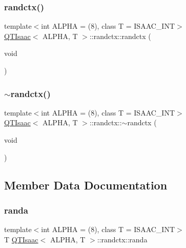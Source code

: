 \subsubsection{\texorpdfstring{randctx()}{randctx()}}
{\footnotesize\ttfamily template$<$int A\+L\+P\+HA = (8), class T = I\+S\+A\+A\+C\+\_\+\+I\+NT$>$ \\
\hyperlink{classQTIsaac}{Q\+T\+Isaac}$<$ A\+L\+P\+HA, T $>$\+::randctx\+::randctx (\begin{DoxyParamCaption}\item[{void}]{ }\end{DoxyParamCaption})\hspace{0.3cm}{\ttfamily [inline]}}

\mbox{\label{structQTIsaac_1_1randctx_a10c2275a173a11614314467047fdf501}} 
\subsubsection{\texorpdfstring{$\sim$randctx()}{~randctx()}}
{\footnotesize\ttfamily template$<$int A\+L\+P\+HA = (8), class T = I\+S\+A\+A\+C\+\_\+\+I\+NT$>$ \\
\hyperlink{classQTIsaac}{Q\+T\+Isaac}$<$ A\+L\+P\+HA, T $>$\+::randctx\+::$\sim$randctx (\begin{DoxyParamCaption}\item[{void}]{ }\end{DoxyParamCaption})\hspace{0.3cm}{\ttfamily [inline]}}



\subsection{Member Data Documentation}
\mbox{\label{structQTIsaac_1_1randctx_abdf0625b9f67bf4b7975b2c71034c796}} 
\subsubsection{\texorpdfstring{randa}{randa}}
{\footnotesize\ttfamily template$<$int A\+L\+P\+HA = (8), class T = I\+S\+A\+A\+C\+\_\+\+I\+NT$>$ \\
T \hyperlink{classQTIsaac}{Q\+T\+Isaac}$<$ A\+L\+P\+HA, T $>$\+::randctx\+::randa}

